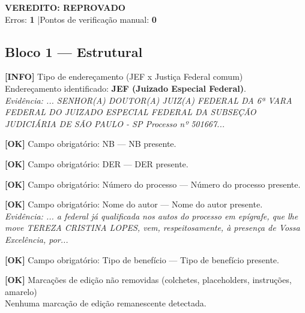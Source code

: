 \documentclass[12pt,a4paper]{article}
\newcommand{\statusOK}[1]{\textcolor{corOK}{\textbf{[OK]}} #1}
\newcommand{\statusINFO}[1]{\textcolor{corINFO}{\textbf{[INFO]}} #1}
\begin{document}
\vspace{0.5em}

\noindent\colorbox{corFundoReprovado}{%
  \begin{minipage}{\dimexpr\linewidth-2\fboxsep}
    \centering
    \vspace{0.3em}
    {\large \textcolor{corERRO}{\textbf{VEREDITO: REPROVADO}}}\\
    Erros: \textbf{1} \quad|\quad Pontos de verificação manual: \textbf{0}
    \vspace{0.3em}
  \end{minipage}%
}

\vspace{1em}


\subsection{Bloco 1 --- Estrutural}

\statusINFO{Tipo de endereçamento (JEF x Justiça Federal comum)}\\
Endereçamento identificado: \textbf{JEF (Juizado Especial Federal)}.\\
\textit{Evidência: ... SENHOR(A) DOUTOR(A) JUIZ(A) FEDERAL DA 6ª VARA FEDERAL DO JUIZADO ESPECIAL FEDERAL DA SUBSEÇÃO JUDICIÁRIA DE SÃO PAULO - SP Processo nº 501667...}

\medskip
\statusOK{Campo obrigatório: NB} --- NB presente.

\medskip
\statusOK{Campo obrigatório: DER} --- DER presente.

\medskip
\statusOK{Campo obrigatório: Número do processo} --- Número do processo presente.

\medskip
\statusOK{Campo obrigatório: Nome do autor} --- Nome do autor presente.\\
\textit{Evidência: ... a federal já qualificada nos autos do processo em epígrafe, que lhe move TEREZA CRISTINA LOPES, vem, respeitosamente, à presença de Vossa Excelência, por...}

\medskip
\statusOK{Campo obrigatório: Tipo de benefício} --- Tipo de benefício presente.

\medskip
\statusOK{Marcações de edição não removidas (colchetes, placeholders, instruções, amarelo)}\\
Nenhuma marcação de edição remanescente detectada.
\end{document}
